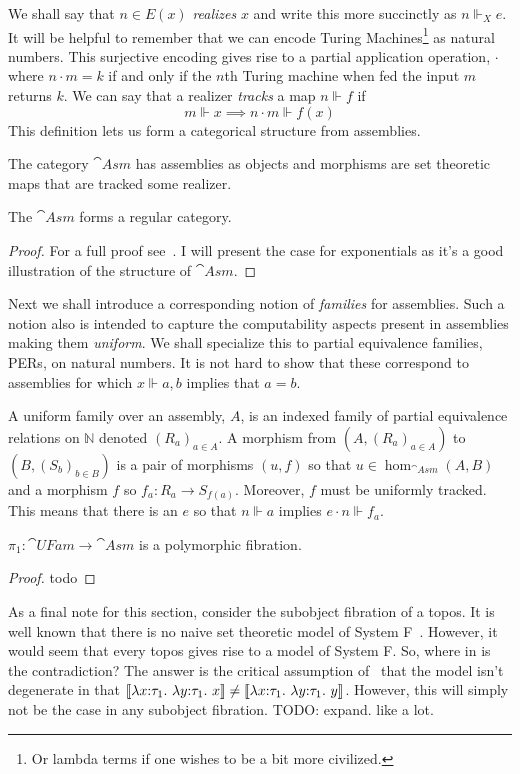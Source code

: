 We shall say that $n \in E(x)$ \emph{realizes} $x$ and write this more
succinctly as $n \Vdash_X e$. It will be helpful to remember that we
can encode Turing Machines\footnote{Or lambda terms if one wishes to
  be a bit more civilized.} as natural numbers. This surjective
encoding gives rise to a partial application operation, $\cdot$ where
$n \cdot m = k$ if and only if the $n$th Turing machine when fed the
input $m$ returns $k$. We can say that a realizer \emph{tracks} a map
$n \Vdash f$ if
\[
  m \Vdash x \implies n \cdot m \Vdash f(x)
\]
This definition lets us form a categorical structure from assemblies.
\begin{defn}\label{defn:systemf:asm}
  The category $\cat{Asm}$ has assemblies as objects and morphisms are
  set theoretic maps that are tracked some realizer.
\end{defn}
\begin{thm}\label{thm:systemf:asmregular}
  The $\cat{Asm}$ forms a regular category.
\end{thm}
\begin{proof}
  For a full proof see~\citet{VanOosten:08}. I will present the case
  for exponentials as it's a good illustration of the structure of
  $\cat{Asm}$.
\end{proof}
Next we shall introduce a corresponding notion of \emph{families} for
assemblies. Such a notion also is intended to capture the
computability aspects present in assemblies making them
\emph{uniform}. We shall specialize this to partial equivalence
families, PERs, on natural numbers. It is not hard to show that these
correspond to assemblies for which $x \Vdash a, b$ implies that $a =
b$.
\begin{defn}\label{defn:systemf:ufam}
  A uniform family over an assembly, $A$, is an indexed family of
  partial equivalence relations on $\mathbb{N}$ denoted
  $(R_a)_{a \in A}$. A morphism from $(A, (R_a)_{a \in A})$ to
  $(B, (S_b)_{b \in B})$ is a pair of morphisms $(u, f)$ so that
  $u \in \hom_{\cat{Asm}}(A, B)$ and a morphism $f$ so
  $f_a : R_a \to S_{f(a)}$. Moreover, $f$ must be uniformly
  tracked. This means that there is an $e$ so that $n \Vdash a$
  implies $e \cdot n \Vdash f_a$.
\end{defn}
\begin{thm}
  $\pi_1 : \cat{UFam} \to \cat{Asm}$ is a polymorphic fibration.
\end{thm}
\begin{proof}
  todo
\end{proof}

As a final note for this section, consider the subobject fibration of
a topos. It is well known that there is no naive set theoretic model
of System F~\cite{Reynolds:84}. However, it would seem that every
topos gives rise to a model of System F. So, where in is the
contradiction? The answer is the critical assumption
of~\citet{Reynolds:84} that the model isn't degenerate in that
$\llbracket \lambda x \mathord{:} \tau_1.\ \lambda y \mathord{:} \tau_1.\ x \rrbracket \neq
\llbracket \lambda x \mathord{:} \tau_1.\ \lambda y \mathord{:} \tau_1.\ y \rrbracket$. However, this will simply
not be the case in any subobject fibration. TODO: expand. like a lot.
